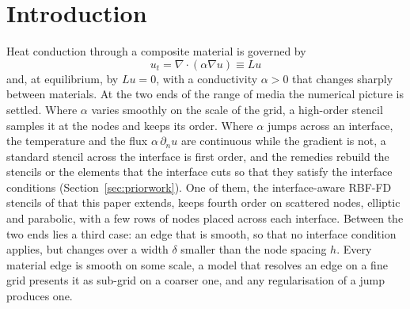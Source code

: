\documentclass[11pt]{amsart}
\theoremstyle{definition}
\theoremstyle{remark}
\begin{document}
\section{Introduction}
\label{sec:intro}

Heat conduction through a composite material is governed by
\begin{equation}
  \label{eq:heat}
  u_t = \nabla \cdot (\alpha \nabla u) \equiv L u
\end{equation}
and, at equilibrium, by $L u = 0$, with a conductivity $\alpha > 0$ that
changes sharply between materials. At the two ends of the range of media
the numerical picture is settled. Where $\alpha$ varies smoothly on
the scale of the grid, a high-order stencil samples it at the nodes and
keeps its order. Where $\alpha$ jumps across an interface, the temperature
and the flux $\alpha\, \partial_n u$ are continuous while the gradient is
not, a standard stencil across the interface is first order, and the
remedies rebuild the stencils or the elements that the interface cuts so
that they satisfy the interface conditions (Section~\ref{sec:priorwork}).
One of them, the interface-aware RBF-FD stencils of
\cite{Martin2016,MartinFornberg2017heat} that this paper extends, keeps
fourth order on scattered nodes, elliptic and parabolic, with a few rows of
nodes placed across each interface. Between the two ends lies a third case:
an edge that is smooth, so that no interface condition applies, but
changes over a width $\delta$ smaller than the node spacing $h$. Every
material edge is smooth on some scale, a model that resolves an edge on a
fine grid presents it as sub-grid on a coarser one, and any regularisation
of a jump produces one.
\end{document}

